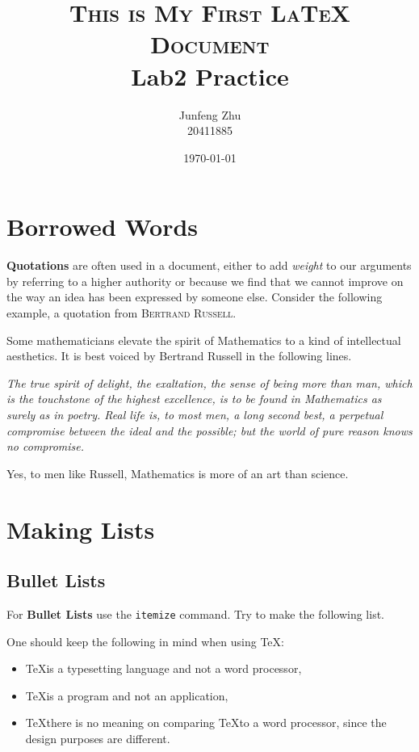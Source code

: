 \documentclass[a4paper,11pt]{article}
\title{\textsc{ This is My First LaTeX Document }\\   {\small Lab2 Practice}}
\author{Junfeng Zhu\\20411885}
\date{\today}
\begin{document}
\maketitle
\section{Borrowed Words}
\textbf{Quotations} are often used in a document, either to add \textit{weight} to our arguments by referring to a higher authority or because we find that we cannot improve on the way an idea has been expressed by someone else. Consider the following example, a quotation from \textsc{Bertrand Russell}.

Some mathematicians elevate the spirit of Mathematics to a kind of intellectual aesthetics. It is best voiced by Bertrand Russell in the following lines.

\textit{The true spirit of delight, the exaltation, the sense of being more than man, which is the touchstone of the highest excellence, is to be found in Mathematics as surely as in poetry. Real life is, to most men, a long second best, a perpetual compromise between the ideal and the possible; but the world of pure reason knows no compromise.}

Yes, to men like Russell, Mathematics is more of an art than science.

\newpage
\section{Making Lists}
\subsection{Bullet Lists}

For \textbf{Bullet Lists} use the \texttt{itemize} command. Try to make the following list.

One should keep the following in mind when using \TeX:

\begin{itemize}

\item \TeX is a typesetting language and not a word processor,
\item \TeX is a program and not an application,
\item \TeX there is no meaning on comparing \TeX to a word processor, since the design purposes are different.

\end{itemize}
\end{document}
